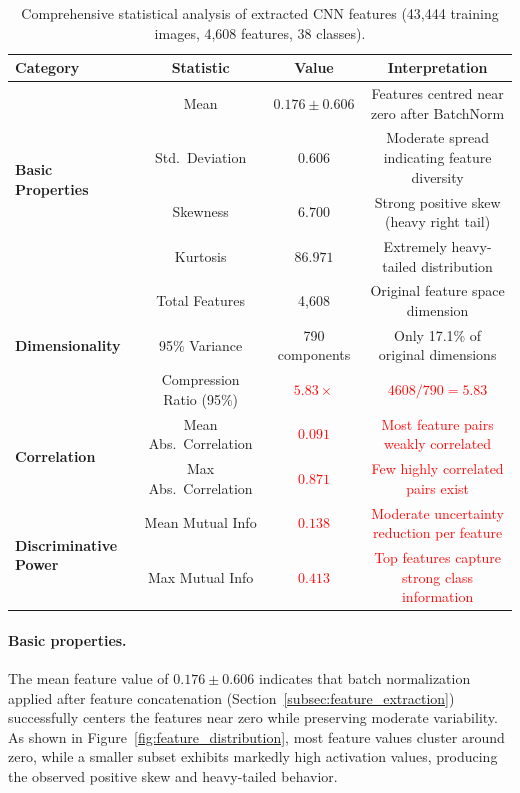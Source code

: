 \documentclass[pdflatex,sn-basic]{sn-jnl}
\begin{document}
\begin{table}[htbp]
\caption{Comprehensive statistical analysis of extracted CNN features (43,444 training images, 4,608 features, 38 classes).}
\label{tab:results_comprehensive_stats}
\begin{tabular*}{\textwidth}{@{\extracolsep\fill}lccc@{}}
\toprule
\textbf{Category} & \textbf{Statistic} & \textbf{Value} & \textbf{Interpretation} \\
\midrule
\multirow{4}{*}{\textbf{Basic Properties}}
 & Mean              & $0.176 \pm 0.606$ & Features centred near zero after BatchNorm \\
 & Std.\ Deviation   & $0.606$           & Moderate spread indicating feature diversity \\
 & Skewness          & $6.700$           & Strong positive skew (heavy right tail) \\
 & Kurtosis          & $86.971$          & Extremely heavy-tailed distribution \\
\midrule
\multirow{3}{*}{\textbf{Dimensionality}}
 & Total Features          & 4,608       & Original feature space dimension \\
 & 95\% Variance           & 790 components & Only 17.1\% of original dimensions \\
 & Compression Ratio (95\%)& \textcolor{red}{$5.83\times$} & \textcolor{red}{$4608 / 790 = 5.83$} \\
\midrule
\multirow{2}{*}{\textbf{Correlation}}
 & Mean Abs.\ Correlation & \textcolor{red}{$0.091$} & \textcolor{red}{Most feature pairs weakly correlated} \\
 & Max Abs.\ Correlation  & \textcolor{red}{$0.871$} & \textcolor{red}{Few highly correlated pairs exist} \\
\midrule
\multirow{2}{*}{\textbf{Discriminative Power}}
 & Mean Mutual Info & \textcolor{red}{$0.138$} & \textcolor{red}{Moderate uncertainty reduction per feature} \\
 & Max Mutual Info  & \textcolor{red}{$0.413$} & \textcolor{red}{Top features capture strong class information} \\
\bottomrule
\end{tabular*}
\end{table}

\paragraph{Basic properties.}
The mean feature value of $0.176 \pm 0.606$ indicates that batch normalization applied after feature concatenation (Section~\ref{subsec:feature_extraction}) successfully centers the features near zero while preserving moderate variability. As shown in Figure~\ref{fig:feature_distribution}, most feature values cluster around zero, while a smaller subset exhibits markedly high activation values, producing the observed positive skew and heavy-tailed behavior.
\end{document}
